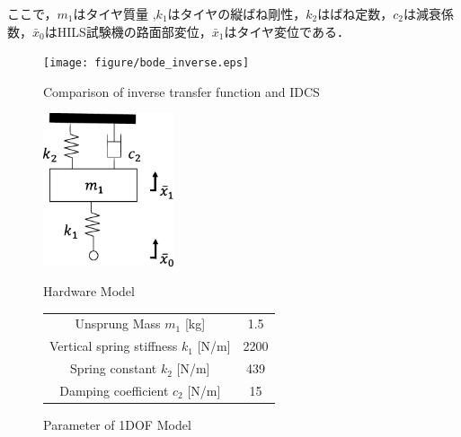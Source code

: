 \documentclass[a4paper,12pt]{article_vdlab_sotsuron}
\begin{document}
ここで，$m_1$はタイヤ質量 ,$k_1$はタイヤの縦ばね剛性，$k_2$はばね定数，$c_2$は減衰係数，$\bar{x}_0$はHILS試験機の路面部変位，$\bar{x}_1$はタイヤ変位である．

\vspace{7mm}
\begin{figure}[htp]
  \begin{center}
    \texttt{[image: figure/bode\_inverse.eps]}
    \caption{Comparison of inverse transfer function and IDCS}
    \label{fig:bode_inv_idcs}
  \end{center}
\end{figure}
\vspace{7mm}
\begin{figure}[h]
  \begin{minipage}{0.4\hsize}
     \begin{center}
      \includegraphics[height=45mm]{figure/hardware_model.eps}
	\vspace{2mm}
      \caption{Hardware Model}
      \label{fig:hardware_model}
    \end{center}
  \end{minipage}
  \vspace{7mm}
\begin{minipage}{0.6\hsize}
\makeatletter
\def\@captype{table}
\makeatother
  \begin{center}
   \caption{Parameter of 1DOF Model}
   \label{tab:parameter_1dof}
   \begin{tabular}{cc}\hline
      Unsprung Mass $m_1$ [kg] & 1.5  \\
      Vertical spring stiffness $k_1$ [N/m] & 2200  \\
      Spring constant $k_2$ [N/m] & 439   \\
      Damping coefficient $c_2$ [N/m] & 15   \\ \hline
    \end{tabular}
   \end{center}
 \end{minipage}
\end{figure}
\newpage
\end{document}
